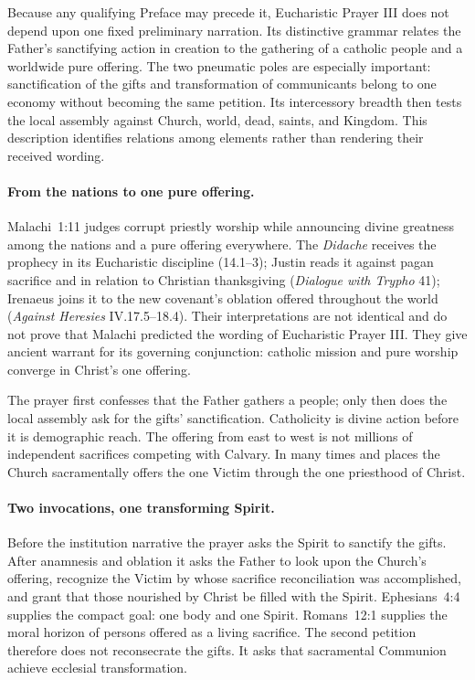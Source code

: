 Because any qualifying Preface may precede it, Eucharistic Prayer III does not depend upon one fixed preliminary narration. Its distinctive grammar relates the Father's sanctifying action in creation to the gathering of a catholic people and a worldwide pure offering. The two pneumatic poles are especially important: sanctification of the gifts and transformation of communicants belong to one economy without becoming the same petition. Its intercessory breadth then tests the local assembly against Church, world, dead, saints, and Kingdom. This description identifies relations among elements rather than rendering their received wording.

\paragraph{From the nations to one pure offering.}
Malachi~1:11 judges corrupt priestly worship while announcing divine greatness among the nations and a pure offering everywhere. The \emph{Didache} receives the prophecy in its Eucharistic discipline (14.1--3); Justin reads it against pagan sacrifice and in relation to Christian thanksgiving (\emph{Dialogue with Trypho} 41); Irenaeus joins it to the new covenant's oblation offered throughout the world (\emph{Against Heresies} IV.17.5--18.4). Their interpretations are not identical and do not prove that Malachi predicted the wording of Eucharistic Prayer III\@. They give ancient warrant for its governing conjunction: catholic mission and pure worship converge in Christ's one offering.

The prayer first confesses that the Father gathers a people; only then does the local assembly ask for the gifts' sanctification. Catholicity is divine action before it is demographic reach. The offering from east to west is not millions of independent sacrifices competing with Calvary. In many times and places the Church sacramentally offers the one Victim through the one priesthood of Christ.

\paragraph{Two invocations, one transforming Spirit.}
Before the institution narrative the prayer asks the Spirit to sanctify the gifts. After anamnesis and oblation it asks the Father to look upon the Church's offering, recognize the Victim by whose sacrifice reconciliation was accomplished, and grant that those nourished by Christ be filled with the Spirit. Ephesians~4:4 supplies the compact goal: one body and one Spirit. Romans~12:1 supplies the moral horizon of persons offered as a living sacrifice. The second petition therefore does not reconsecrate the gifts. It asks that sacramental Communion achieve ecclesial transformation.

